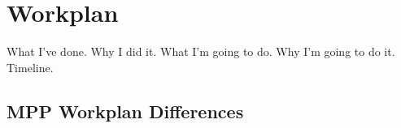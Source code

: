 \section{Workplan}\label{workplan}

What I've done. Why I did it. What I'm going to do. Why I'm going to do it. Timeline.


\subsection{MPP Workplan Differences}











